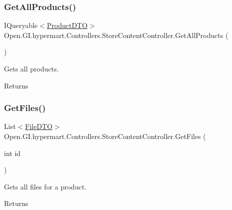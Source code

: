\subsubsection{\texorpdfstring{Get\+All\+Products()}{GetAllProducts()}}
{\footnotesize\ttfamily I\+Queryable$<$\hyperlink{class_open_1_1_g_i_1_1hypermart_1_1_data_transformation_objects_1_1_product_d_t_o}{Product\+D\+TO}$>$ Open.\+G\+I.\+hypermart.\+Controllers.\+Store\+Content\+Controller.\+Get\+All\+Products (\begin{DoxyParamCaption}{ }\end{DoxyParamCaption})}



Gets all products. 

\begin{DoxyReturn}{Returns}

\end{DoxyReturn}
\hypertarget{class_open_1_1_g_i_1_1hypermart_1_1_controllers_1_1_store_content_controller_ae0b56b375fd34ca44fd3d7c32be04c04}{}\label{class_open_1_1_g_i_1_1hypermart_1_1_controllers_1_1_store_content_controller_ae0b56b375fd34ca44fd3d7c32be04c04} 
\subsubsection{\texorpdfstring{Get\+Files()}{GetFiles()}}
{\footnotesize\ttfamily List$<$\hyperlink{class_open_1_1_g_i_1_1hypermart_1_1_data_transformation_objects_1_1_file_d_t_o}{File\+D\+TO}$>$ Open.\+G\+I.\+hypermart.\+Controllers.\+Store\+Content\+Controller.\+Get\+Files (\begin{DoxyParamCaption}\item[{int}]{id }\end{DoxyParamCaption})}



Gets all files for a product. 

\begin{DoxyReturn}{Returns}

\end{DoxyReturn}
\hypertarget{class_open_1_1_g_i_1_1hypermart_1_1_controllers_1_1_store_content_controller_a4859d188d3e79898959e74538e832247}{}\label{class_open_1_1_g_i_1_1hypermart_1_1_controllers_1_1_store_content_controller_a4859d188d3e79898959e74538e832247} 
